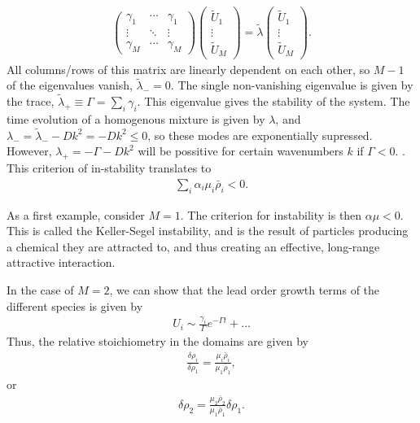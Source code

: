 \begin{align}
    \begin{pmatrix}
        \gamma_1 & \cdots & \gamma_1 \\
        \vdots & \ddots & \vdots \\
        \gamma_M & \cdots & \gamma_M
    \end{pmatrix}
    \begin{pmatrix}
        \tilde U_1 \\ \vdots\\ \tilde U_M
    \end{pmatrix}
    = 
    \tilde \lambda 
    \begin{pmatrix}
        \tilde U_1 \\ \vdots \\\tilde U_M
    \end{pmatrix}.
\end{align}
%
All columns/rows of this matrix are linearly dependent on each other, so $M - 1$ of the eigenvalues vanish, $\tilde \lambda_- = 0 $.
The single non-vanishing eigenvalue is given by the trace, $\tilde \lambda_+ \equiv \Gamma = \sum_i \gamma_i$.
This eigenvalue gives the stability of the system.
The time evolution of a homogenous mixture is given by $\lambda$, and $\lambda_- = \tilde \lambda_- - D k^2 =  - Dk^2 \leq 0$, so these modes are exponentially supressed.
However, $\lambda_+ = -\Gamma - D k^2$ will be possitive for certain wavenumbers $k$ if $\Gamma< 0$.
.
This criterion of in-stability translates to 
%
\begin{align}
    \sum_i \alpha_i \mu_i \bar \rho _i  < 0.
\end{align}
%


As a first example, consider $M=1$.
The criterion for instability is then $\alpha \mu < 0$.
This is called the Keller-Segel instability, and is the result of particles producing a chemical they are attracted to, and thus creating an effective, long-range attractive interaction.

In the case of $M = 2$, we can show that the lead order growth terms of the different species is given by
%
\begin{align}
    U_i \sim \frac{\gamma_i}{\Gamma} e^{-\Gamma t} + \dots
\end{align}
%
Thus, the relative stoichiometry in the domains are given by
%
\begin{align}
    \frac{\delta \rho_i}{\delta \rho_1} = \frac{\mu_i \bar \rho_i}{\mu_1 \bar \rho_1},
\end{align}
%
or
%
\begin{align}
    \delta \rho_2 = \frac{\mu_2 \bar \rho_2}{\mu_1 \bar \rho_1} \delta \rho_1.
\end{align}
%



